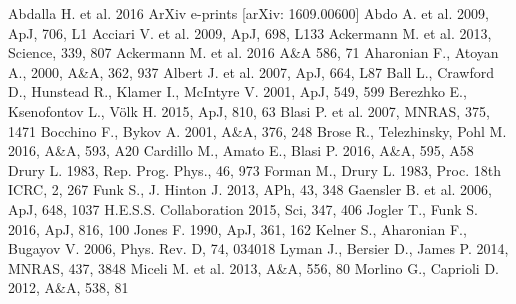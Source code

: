 \documentclass{aa}
\begin{document}
\begin{thebibliography}{99}
 Abdalla H. et al. 2016 ArXiv e-prints [arXiv: 1609.00600]
 Abdo A. et al. 2009, ApJ, 706, L1
 Acciari V. et al. 2009, ApJ, 698, L133
 Ackermann M. et al. 2013, Science, 339, 807
 Ackermann M. et al. 2016 A\&A 586, 71
 Aharonian F., Atoyan A., 2000, A\&A, 362, 937 
 Albert J. et al. 2007, ApJ, 664, L87
 Ball L., Crawford D., Hunstead R., Klamer I., McIntyre V. 2001, ApJ, 549, 599
 Berezhko E., Ksenofontov L., V\"olk H. 2015, ApJ, 810, 63
 Blasi P. et al. 2007, MNRAS, 375, 1471
 Bocchino F., Bykov A. 2001, A\&A, 376, 248
 Brose R., Telezhinsky, Pohl M. 2016, A\&A, 593, A20 
 Cardillo M., Amato E., Blasi P. 2016, A\&A, 595, A58
 Drury L. 1983, Rep. Prog. Phys., 46, 973 
 Forman M., Drury L. 1983, Proc. 18th ICRC, 2, 267 
 Funk S., J. Hinton J. 2013, APh, 43, 348
 Gaensler B. et al. 2006, ApJ, 648, 1037
 H.E.S.S. Collaboration 2015, Sci, 347, 406
 Jogler T., Funk S. 2016, ApJ, 816, 100  
 Jones F. 1990, ApJ, 361, 162 
 Kelner S., Aharonian F., Bugayov V. 2006, Phys. Rev. D, 74, 034018 
 Lyman J., Bersier D., James P. 2014, MNRAS, 437, 3848
 Miceli M. et al. 2013, A\&A, 556, 80 
 Morlino G., Caprioli D. 2012, A\&A, 538, 81

\end{thebibliography}
\end{document}
